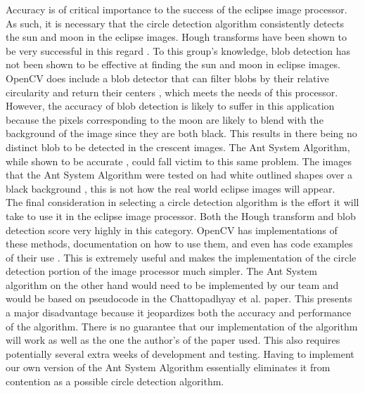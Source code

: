 \documentclass[10pt, onecolumn, draftclsnofoot, letterpaper, compsoc]{IEEEtran}
\begin{document}
Accuracy is of critical importance to the success of the eclipse image
processor. As such, it is necessary that the circle detection algorithm
consistently detects the sun and moon in the eclipse images. Hough transforms
have been shown to be very successful in this regard \cite{imgKrista}. To this
group’s knowledge, blob detection has not been shown to be effective at finding
the sun and moon in eclipse images. OpenCV does include a blob detector that can
filter blobs by their relative circularity and return their centers
\cite{blobarticle, blobref}, which meets the needs of this processor. However,
the accuracy of blob detection is likely to suffer in this application because
the pixels corresponding to the moon are likely to blend with the background of
the image since they are both black. This results in there being no distinct
blob to be detected in the crescent images. The Ant System Algorithm, while
shown to be accurate \cite{antsystem}, could fall victim to this same problem.
The images that the Ant System Algorithm were tested on had white outlined
shapes over a black background \cite{antsystem}, this is not how the real world
eclipse images will appear. \\


The final consideration in selecting a circle detection algorithm is the effort
it will take to use it in the eclipse image processor. Both the Hough transform
and blob detection score very highly in this category. OpenCV has
implementations of these methods, documentation on how to use them, and even has
code examples of their use \cite{houghocv, blobarticle}. This is extremely useful
and makes the implementation of the circle detection portion of the image
processor much simpler. The Ant System algorithm on the other hand would need to
be implemented by our team and would be based on pseudocode in the Chattopadhyay
et al. paper. This presents a major disadvantage because it jeopardizes both the
accuracy and performance of the algorithm. There is no guarantee that our
implementation of the algorithm will work as well as the one the author’s of the
paper used. This also requires potentially several extra weeks of development
and testing. Having to implement our own version of the Ant System Algorithm
essentially eliminates it from contention as a possible circle detection
algorithm. \\
\end{document}
